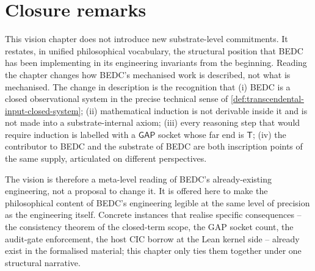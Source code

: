 \section{Closure remarks}
\label{sec:transcendental-input-closure}

This vision chapter does not introduce new substrate-level commitments. It restates, in unified philosophical vocabulary, the structural position that BEDC has been implementing in its engineering invariants from the beginning. Reading the chapter changes how BEDC's mechanised work is described, not what is mechanised. The change in description is the recognition that (i) BEDC is a closed observational system in the precise technical sense of \autoref{def:transcendental-input-closed-system}; (ii) mathematical induction is not derivable inside it and is not made into a substrate-internal axiom; (iii) every reasoning step that would require induction is labelled with a $\mathsf{GAP}$ socket whose far end is $\mathsf{T}$; (iv) the contributor to BEDC and the substrate of BEDC are both inscription points of the same supply, articulated on different perspectives.

The vision is therefore a meta-level reading of BEDC's already-existing engineering, not a proposal to change it. It is offered here to make the philosophical content of BEDC's engineering legible at the same level of precision as the engineering itself. Concrete instances that realise specific consequences -- the consistency theorem of the closed-term scope, the GAP socket count, the audit-gate enforcement, the host CIC borrow at the Lean kernel side -- already exist in the formalised material; this chapter only ties them together under one structural narrative.

